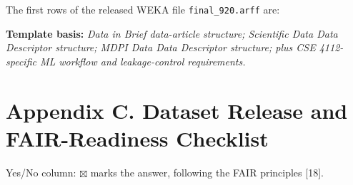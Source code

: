\documentclass[11pt,a4paper]{article}
\begin{document}
The first rows of the released WEKA file \texttt{final\_920.arff} are:
{\footnotesize
{}}

\textbf{Template basis:} \emph{Data in Brief data-article structure; Scientific Data Data Descriptor structure; MDPI Data Data Descriptor structure; plus CSE 4112-specific ML workflow and leakage-control requirements.}

\section{Appendix C. Dataset Release and FAIR-Readiness Checklist}
Yes/No column: $\boxtimes$ marks the answer, following the FAIR principles [18].
\end{document}
